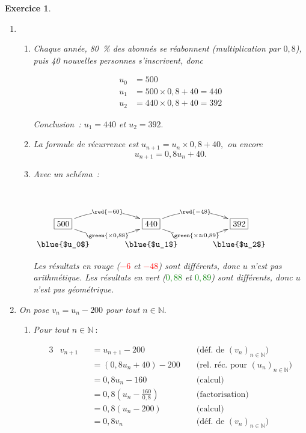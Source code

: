 \documentclass[10pt]{article}
\newtheorem{exo}{Exercice}
\begin{document}
\begin{exo}

\begin{enumerate}
\item \begin{enumerate}
\item Chaque année, 80~\% des abonnés se réabonnent (multiplication par $0,8$), puis 40  nouvelles personnes s'inscrivent, donc

\begin{align*}
u_0&=500\\
u_1&=500\times 0,8+40=440\\
u_2&=440\times 0,8+40=392
\end{align*}



Conclusion~: $u_1=440$ et  $u_2=392.$
\item La formule de récurrence est $u_{n+1}=u_n\times 0,8+40,$ ou encore
\[u_{n+1}=0,8u_n+40.\]
\item Avec un schéma~:


~{}\begin{center}
    $\xymatrix@R=0.5pc@C=3pc{
    *+[F]+{500} \ar@/^0.5cm/[r]|{\red{-60}} \ar@/_0.5cm/[r]|{\green{\times 0,88}} & 
    *+[F]+{440} \ar@/^0.5cm/[r]|{\red{-48}} \ar@/_0.5cm/[r]|{\green{\times \approx 0,89}} & *+[F]+{392} \\
    \txt{\blue{$u_0$}}&
    \txt{\blue{$u_1$}}&\txt{\blue{$u_2$}}    
    }$
    \end{center}
    
    
    \medskip
    
    Les résultats en rouge (\textcolor{red}{$-6$} et \textcolor{red}{$-48$}) sont différents, donc $u$ n'est pas arithmétique.  Les résultats en vert (\textcolor{green}{$0,88$} et \textcolor{green}{$0,89$}) sont différents, donc $u$ n'est pas géométrique.
    
\end{enumerate}
\item 
On pose $v_n=u_n -200$ pour tout $n\in\mathbb{N}.$
\begin{enumerate}
\item Pour tout $n\in\mathbb{N}~:$



\begin{alignat*}{3}
&v_{n+1}&& =u_{n+1}-200 && \text{  (déf. de } (v_n)_{n\in\mathbb{N}})\\
& && =(0,8u_n+40)-200 && \text{  (rel. réc. pour } (u_n)_{n\in\mathbb{N}})\\
& && =0,8u_n-160 && \text{  (calcul)}\\
& && =0,8\left(u_n-\frac{160}{0,8}\right) && \text{  (factorisation)}\\
& && =0,8(u_n-200) && \text{  (calcul)}\\
& && =0,8v_n&& \text{  (déf. de } (v_n)_{n\in\mathbb{N}})\\
\end{alignat*}


\end{enumerate}
\end{enumerate}
\end{exo}
\end{document}
